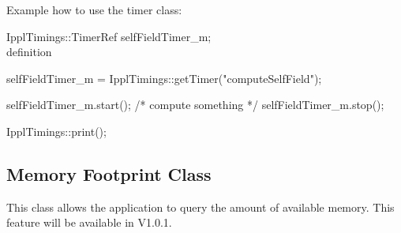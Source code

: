 \clearpage

Example how to use the timer class: \\
\begin{code}

IpplTimings::TimerRef selfFieldTimer_m;    \\ definition

selfFieldTimer_m = IpplTimings::getTimer("computeSelfField");  
 
selfFieldTimer_m.start(); 
    /* compute something */
selfFieldTimer_m.stop();

IpplTimings::print();

\end{code}

\subsection{Memory Footprint Class}
This class allows the application to query the amount of 
available memory. This feature will be available in V1.0.1.



\begin{verbatim}


\end{verbatim}





\begin{verbatim}


\end{verbatim}
